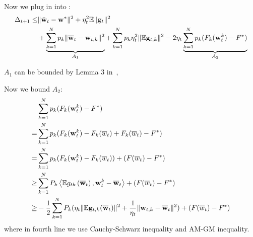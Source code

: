 Now we plug in \eq{\ref{eq:exp4}} into \eq{\ref{eq:expand}}:
\begin{align}
	\Delta_{t+1} \leq& \|\bar{{\mathbf{w}}}_{t}-{\mathbf{w}}^{*}\|^{2} + \eta_{t}^{2} \mathbb{E}\| {\mathbf{g}}_{t} \|^{2} \\
	& + \underbrace{\sum_{k=1}^N p_k \|\overline{{\mathbf{w}}}_t - {\mathbf{w}}_{t,k}\|^2}_{A_1} +  \sum_{k=1}^N p_k \eta_t^2 \|\mathbb{E} {\mathbf{g}}_{t,k}\|^2
  - 2\eta_t\underbrace{\sum_{k=1}^N p_k (F_k({\mathbf{w}}_t^k) - F^*)}_{A_2} \label{eq:main2}
\end{align}

$A_1$ can be bounded by Lemma 3 in~\cite{li2019convergence}, 


Now we bound $A_2$:
\begin{align}
	& \sum_{k=1}^N p_k (F_k({\mathbf{w}}_t^k) - F^*) \\
 = & \sum_{k=1}^N p_k (F_k({\mathbf{w}}_t^k) - F_k(\overline{w}_t) + F_k(\overline{w}_t) - F^*) \\
 = & \sum_{k=1}^N p_k (F_k({\mathbf{w}}_t^k) - F_k(\overline{w}_t) ) + (F(\overline{w}_t) - F^*)\\ 
 \geq & \sum_{k=1}^{N} P_{k}\left<\mathbb{E} g_{t k}\left(\overline{{\mathbf{w}}}_{t}\right), {\mathbf{w}}_{t}^k-\overline{{\mathbf{w}}}_{t}\right> + (F(\overline{w}_t) - F^*)\\
 \geq& -\frac{1}{2} \sum_{k=1}^{N} P_{k} (\eta_t \|\mathbb{E} {\mathbf{g}}_{t,k}(\overline{{\mathbf{w}}}_t) \|^2 + \frac{1}{\eta_t} \|{\mathbf{w}}_{t,k} - \overline{{\mathbf{w}}}_t\|^2) + (F(\overline{w}_t) - F^*) \label{eq:a24}
\end{align}
where in fourth line we use Cauchy-Schwarz inequality and AM-GM inequality. 


